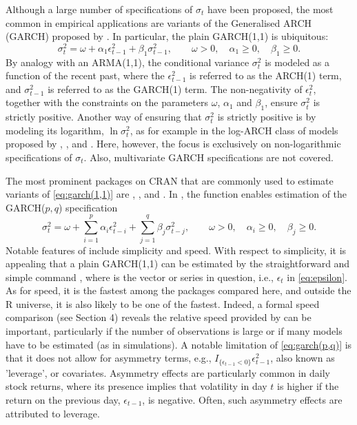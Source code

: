 Although a large number of specifications of $\sigma_t$ have been proposed, the most common in empirical applications are variants of the Generalised ARCH (GARCH) proposed by \citet{Bollerslev86}. In particular, the plain GARCH(1,1) is ubiquitous:
%
\begin{equation}\label{eq:garch(1,1)}
	\sigma_t^2 = \omega + \alpha_1 \epsilon_{t-1}^2 + \beta_1 \sigma_{t-1}^2, \qquad \omega > 0, \quad \alpha_1 \geq 0, \quad \beta_1 \geq 0.
\end{equation}
%
By analogy with an ARMA(1,1), the conditional variance $\sigma_t^2$ is modeled as a function of the recent past, where the $\epsilon_{t-1}^2$ is referred to as the ARCH(1) term, and $\sigma_{t-1}^2$ is referred to as the GARCH(1) term. The non-negativity of $\epsilon_t^2$, together with the constraints on the parameters $\omega$, $\alpha_1$ and $\beta_1$, ensure $\sigma_t^2$ is strictly positive. Another way of ensuring that $\sigma_t^2$ is strictly positive is by modeling its logarithm, $\ln\sigma_t^2$, as for example in the log-ARCH class of models proposed by \citet{Geweke86}, \citet{Pantula86}, and \citet{Milhoj1987}. Here, however, the focus is exclusively on non-logarithmic specifications of $\sigma_t$. Also, multivariate GARCH specifications are not covered.

The most prominent packages on CRAN that are commonly used to estimate variants of \eqref{eq:garch(1,1)} are  \citep{TraplettiHornik2019},  \citep{WuertzSetzChalabiBoudtChausseMiklovac2020}, and  \citep{Ghalanos2020}. In , the function  enables estimation of the GARCH($p,q$) specification
%
\begin{equation}\label{eq:garch(p,q)}
	\sigma_t^2 = \omega + \sum_{i=1}^p \alpha_i \epsilon_{t-i}^2 + \sum_{j=1}^q \beta_j \sigma_{t-j}^2, \qquad \omega > 0, \quad \alpha_i \geq 0, \quad \beta_j \geq 0.
\end{equation}
%
Notable features of  include simplicity and speed. With respect to simplicity, it is appealing that a plain GARCH(1,1) can be estimated by the straightforward and simple command , where  is the vector or series in question, i.e., $\epsilon_t$ in \eqref{eq:epsilon}. As for speed, it is the fastest among the packages compared here, and outside the R universe, it is also likely to be one of the fastest. Indeed, a formal speed comparison (see Section 4) reveals the relative speed provided by  can be important, particularly if the number of observations is large or if many models have to be estimated (as in simulations). A notable limitation of \eqref{eq:garch(p,q)} is that it does not allow for asymmetry terms, e.g., $I_{ \{\epsilon_{t-1} < 0 \} } \epsilon_{t-1}^2$, also known as 'leverage', or covariates. Asymmetry effects are particularly common in daily stock returns, where its presence implies that volatility in day $t$ is higher if the return on the previous day, $\epsilon_{t-1}$, is negative. Often, such asymmetry effects are attributed to leverage.

